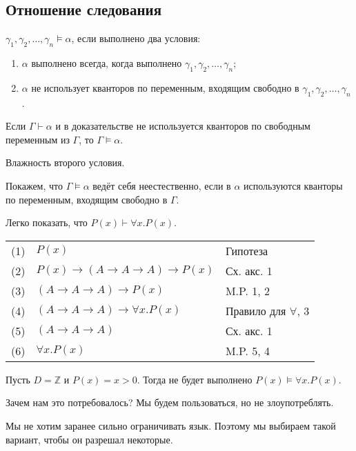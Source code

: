 \subsection{Отношение следования}

\begin{definition}[Следование]
    $\gamma_1,\gamma_2,\dots,\gamma_n\models\alpha$, если выполнено два условия:
\begin{enumerate}
\item $\alpha$ выполнено всегда, когда выполнено $\gamma_1,\gamma_2,\dots,\gamma_n$;
\item $\alpha$ не использует кванторов по переменным, входящим свободно в $\gamma_1,\gamma_2,\dots,\gamma_n$.
\end{enumerate}
\end{definition}

\begin{theorem}
    Если $\Gamma\vdash\alpha$ и в доказательстве не используется кванторов по свободным
переменным из $\Gamma$, то $\Gamma\models\alpha$.
\end{theorem}

Влажность второго условия.
\begin{example}
    Покажем, что $\Gamma\models\alpha$ ведёт себя неестественно, если
в $\alpha$ используются кванторы по переменным, входящим свободно в $\Gamma$.

Легко показать, что $P(x)\vdash \forall x.P(x)$.

\begin{tabular}{lll}
(1) & $P(x)$ & Гипотеза \\
(2) & $P(x)\rightarrow (A\rightarrow A \rightarrow A) \rightarrow P(x)$ & Сх. акс. 1\\
(3) & $(A\rightarrow A \rightarrow A) \rightarrow P(x)$ & M.P. 1, 2\\
(4) & $(A\rightarrow A \rightarrow A) \rightarrow \forall x.P(x)$ & Правило для $\forall$, 3\\
(5) & $(A\rightarrow A \rightarrow A)$ & Сх. акс. 1\\
(6) & $\forall x.P(x)$ & M.P. 5, 4
\end{tabular}

Пусть $D = \mathbb{Z}$ и $P(x) = x > 0$. Тогда не будет выполнено $P(x)\models \forall x.P(x)$.
\end{example}

Зачем нам это потребовалось?  Мы будем пользоваться, но не злоупотреблять.

Мы не хотим заранее сильно ограничивать язык. Поэтому мы выбираем такой вариант, чтобы он разрешал некоторые.

